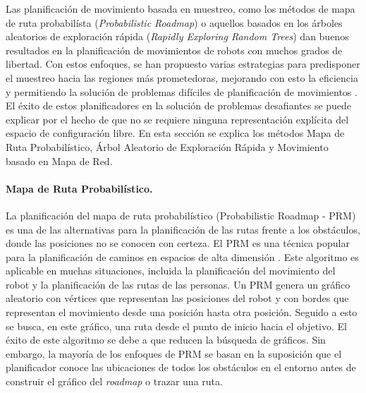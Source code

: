 Las planificación de movimiento basada en muestreo, como los métodos 
de mapa de ruta probabilísta (\textit{Probabilistic Roadmap}) o aquellos 
basados en los árboles aleatorios de exploración rápida 
(\textit{Rapidly Exploring Random Trees}) dan buenos resultados 
en la planificación de movimientos de robots con muchos grados de 
libertad. Con estos enfoques, se han propuesto varias estrategias para 
predisponer el muestreo hacia las regiones más prometedoras, mejorando 
con esto la eficiencia y permitiendo la solución de problemas difíciles 
de planificación de movimientos \cite{elbanhawi2014sampling}. El éxito 
de estos planificadores en la solución de problemas desafiantes se puede 
explicar por el hecho de que no se requiere ninguna representación 
explícita del espacio de configuración libre. En esta sección se 
explica los métodos Mapa de Ruta Probabilístico, Árbol Aleatorio de 
Exploración Rápida y Movimiento basado en Mapa de Red.

\paragraph{Mapa de Ruta Probabilístico.} %

La planificaci\'on del mapa de ruta probabil\'istico (Probabilistic Roadmap - PRM) es 
una de las alternativas para la planificaci\'on de las rutas frente a los  
obst\'aculos, donde las posiciones no se conocen con certeza. El PRM es una 
t\'ecnica popular para la planificaci\'on de caminos en espacios de alta 
dimensi\'on \cite{guibas1999probabilistic}. Este algoritmo es aplicable 
en muchas situaciones, incluida la planificaci\'on del movimiento del 
robot y la planificaci\'on de las rutas de las personas. Un PRM genera 
un gr\'afico aleatorio con v\'ertices que representan las posiciones del 
robot y con bordes que representan el movimiento desde una posici\'on hasta otra 
posici\'on. Seguido a esto se busca, en este gr\'afico, una ruta desde el 
punto de inicio hacia el objetivo. El \'exito de este algoritmo se debe 
a que reducen la b\'usqueda de gr\'aficos. Sin embargo, la mayor\'ia de 
los enfoques de PRM se basan en la suposici\'on que el planificador 
conoce las ubicaciones de todos los obst\'aculos en el entorno antes de 
construir el gr\'afico del \textit{roadmap} o trazar una ruta.

